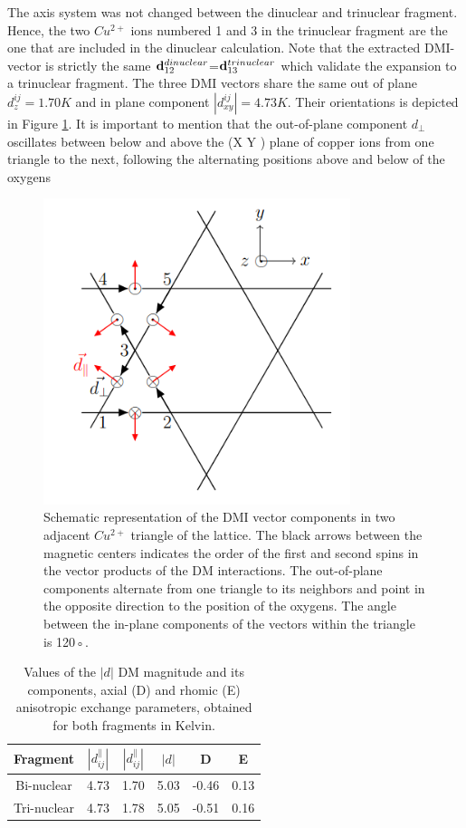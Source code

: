 \documentclass[12pt]{report}
\numberwithin{equation}{section}
\begin{document}
The axis system was not changed between the dinuclear and trinuclear fragment. Hence, the two $Cu^{2+}$ ions numbered 1 and 3 in the trinuclear fragment are the one that are included in the dinuclear calculation.
Note that the extracted DMI-vector is strictly the same $\vb{d}_{12}^{dinuclear}$=$\vb{d}_{13}^{trinuclear}$ which validate the expansion to a trinuclear fragment.
The three DMI vectors share the same out of plane $d_z^{ij}=1.70K$ and in plane component $|d_{xy}^{ij}|=4.73K$.
Their orientations is depicted in Figure \ref{fig:schemaDMI}.
It is important to mention that the out-of-plane component $d_{\perp}$ oscillates between below and above the (X Y ) plane of copper ions from one triangle to the next, following the alternating positions above and below of the oxygens
\begin{figure}[!ht]
    \centering
    \includegraphics[width=0.8\textwidth]{Images/SchemaDMI.png}
    \caption{Schematic representation of the DMI vector components in two adjacent $Cu^{2+}$ triangle of the lattice. The black arrows
    between the magnetic centers indicates the order of the first and second spins in the
    vector products of the DM interactions. The out-of-plane components alternate from
    one triangle to its neighbors and point in the opposite direction to the position of
    the oxygens. The angle between the in-plane components of the vectors within the
    triangle is 120◦. }
    \label{fig:schemaDMI}
\end{figure}

\begin{table}
    \centering
    \begin{tabular}{ c c c c c c }
        \hline
        Fragment & $|d_{ij}^{\parallel}|$ & $|d_{ij}^{\parallel}|$ & $|d|$ & D & E\\
        \hline
        Bi-nuclear & 4.73  & 1.70 &  5.03 & -0.46 & 0.13 \\
        Tri-nuclear & 4.73 & 1.78 &  5.05 & -0.51 & 0.16\\
        \hline 
    \end{tabular}
    \caption{Values of the $|d|$ DM magnitude and its components, axial (D) and rhomic (E) anisotropic exchange parameters, obtained for both fragments in Kelvin.}
    \label{tab:ResumeDMI}
\end{table}
\end{document}

